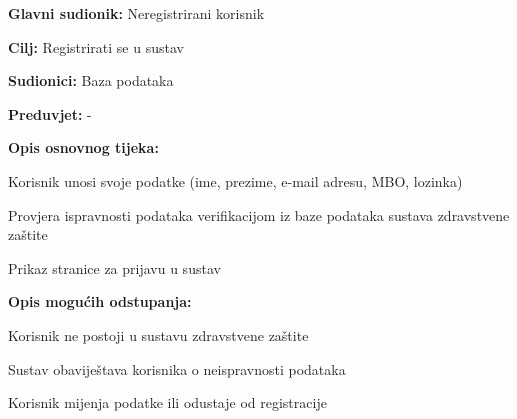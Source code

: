 				\noindent {}
				\begin{packed_item}
					
					\item \textbf{Glavni sudionik: }Neregistrirani korisnik
					\item  \textbf{Cilj: }Registrirati se u sustav
					\item  \textbf{Sudionici: }Baza podataka
					\item  \textbf{Preduvjet: } -  
					\item  \textbf{Opis osnovnog tijeka: }
					
					\item[] \begin{packed_enum}
						
						\item Korisnik unosi svoje podatke (ime, prezime, e-mail adresu, MBO, lozinka)
						\item Provjera ispravnosti podataka verifikacijom iz baze podataka sustava zdravstvene zaštite
						\item Prikaz stranice za prijavu u sustav
					\end{packed_enum}
					
					\item  \textbf{Opis mogućih odstupanja:}
					
					\item[] \begin{packed_item}
						
						\item[2.a] Korisnik ne postoji u sustavu zdravstvene zaštite
						\item[] \begin{packed_enum}
							
							\item Sustav obaviještava korisnika o neispravnosti podataka
							\item Korisnik mijenja podatke ili odustaje od registracije
							
						\end{packed_enum}
						
					\end{packed_item}
				\end{packed_item}
				
